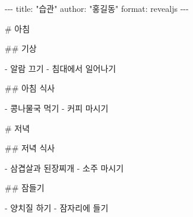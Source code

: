 \documentclass[
  letterpaper,
]{book}
\newenvironment{Shaded}{\begin{snugshade}}{\end{snugshade}}
\newcommand{\AnnotationTok}[1]{\textcolor[rgb]{0.37,0.37,0.37}{#1}}
\newcommand{\CommentTok}[1]{\textcolor[rgb]{0.37,0.37,0.37}{#1}}
\newcommand{\FunctionTok}[1]{\textcolor[rgb]{0.28,0.35,0.67}{#1}}
\newcommand{\NormalTok}[1]{\textcolor[rgb]{0.00,0.23,0.31}{#1}}
\newcommand{\SpecialStringTok}[1]{\textcolor[rgb]{0.13,0.47,0.30}{#1}}
\begin{document}
\begin{Shaded}
\begin{Highlighting}[]
\CommentTok{{-}{-}{-}}
\AnnotationTok{title:}\CommentTok{ "습관"}
\AnnotationTok{author:}\CommentTok{ "홍길동"}
\AnnotationTok{format:}\CommentTok{ revealjs}
\CommentTok{{-}{-}{-}}

\FunctionTok{\# 아침}

\FunctionTok{\#\# 기상}

\SpecialStringTok{{-} }\NormalTok{알람 끄기}
\SpecialStringTok{{-} }\NormalTok{침대에서 일어나기}

\FunctionTok{\#\# 아침 식사}

\SpecialStringTok{{-} }\NormalTok{콩나물국 먹기}
\SpecialStringTok{{-} }\NormalTok{커피 마시기}

\FunctionTok{\# 저녁}

\FunctionTok{\#\# 저녁 식사}

\SpecialStringTok{{-} }\NormalTok{삼겹살과 된장찌개}
\SpecialStringTok{{-} }\NormalTok{소주 마시기}

\FunctionTok{\#\# 잠들기}

\SpecialStringTok{{-} }\NormalTok{양치질 하기}
\SpecialStringTok{{-} }\NormalTok{잠자리에 들기}
\end{Highlighting}
\end{Shaded}
\end{document}
